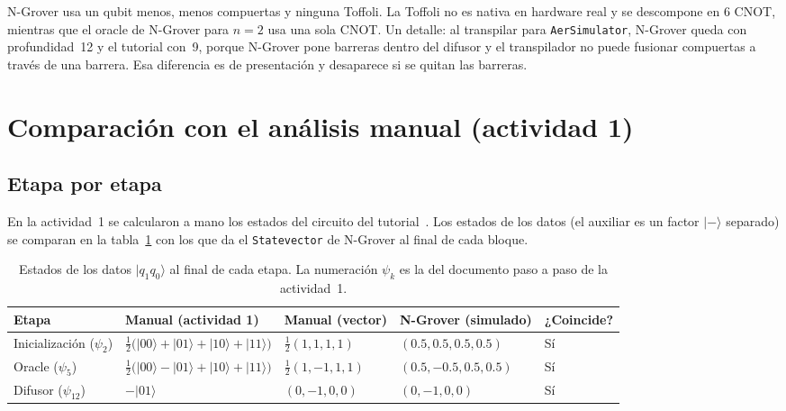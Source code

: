\documentclass[11pt,a4paper]{article}
\providecommand{\ket}{}\renewcommand{\ket}[1]{\lvert #1\rangle}
\renewcommand{\arraystretch}{1.25}
\begin{document}
N-Grover usa un qubit menos, menos compuertas y ninguna Toffoli. La Toffoli no es nativa en hardware real y
se descompone en 6 CNOT, mientras que el oracle de N-Grover para $n=2$ usa una sola CNOT. Un detalle: al
transpilar para \texttt{AerSimulator}, N-Grover queda con profundidad~12 y el tutorial con~9, porque N-Grover
pone barreras dentro del difusor y el transpilador no puede fusionar compuertas a través de una barrera.
Esa diferencia es de presentación y desaparece si se quitan las barreras.

\section{Comparación con el análisis manual (actividad 1)}

\subsection{Etapa por etapa}

En la actividad~1 se calcularon a mano los estados del circuito del tutorial~\cite{parte1,pasoapaso}.
Los estados de los datos (el auxiliar es un factor $\ket-$ separado) se comparan en la tabla~\ref{tab:manual}
con los que da el \texttt{Statevector} de N-Grover al final de cada bloque.

\begin{table}[H]
\centering
\small
\renewcommand{\arraystretch}{1.6}
\begin{tabularx}{\textwidth}{@{}>{\raggedright}p{2.2cm}>{\raggedright}p{4.6cm}>{\centering}p{2.6cm}>{\centering}p{2.6cm}>{\centering\arraybackslash}X@{}}
\toprule
Etapa & Manual (actividad 1) & Manual (vector) & N-Grover (simulado) & ¿Coincide?\\
\midrule
Inicialización ($\psi_2$) & $\frac12\big(\ket{00}+\ket{01}+\ket{10}+\ket{11}\big)$ & $\frac12(1,1,1,1)$ & $(0.5,0.5,0.5,0.5)$ & Sí\\
Oracle ($\psi_5$) & $\frac12\big(\ket{00}-\ket{01}+\ket{10}+\ket{11}\big)$ & $\frac12(1,-1,1,1)$ & $(0.5,-0.5,0.5,0.5)$ & Sí\\
Difusor ($\psi_{12}$) & $-\ket{01}$ & $(0,-1,0,0)$ & $(0,-1,0,0)$ & Sí\\
\bottomrule
\end{tabularx}
\caption{Estados de los datos $\ket{q_1q_0}$ al final de cada etapa. La numeración $\psi_k$ es la del documento paso a paso de la actividad~1.}
\label{tab:manual}
\end{table}
\end{document}
